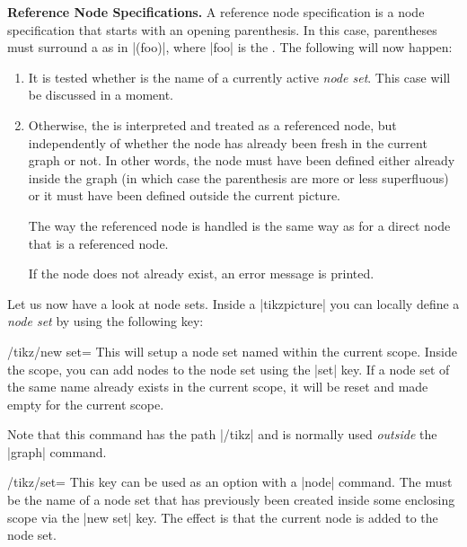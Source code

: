 \medskip
\textbf{Reference Node Specifications.} A reference node specification is a
node specification that starts with an opening parenthesis. In this case,
parentheses must surround a  as in |(foo)|, where |foo| is the
. The following will now happen:
%
\begin{enumerate}
    \item It is tested whether  is the name of a currently active
        \emph{node set}. This case will be discussed in a moment.
    \item Otherwise, the  is interpreted and treated as a referenced
        node, but independently of whether the node has already been fresh in
        the current graph or not. In other words, the node must have been
        defined either already inside the graph (in which case the parenthesis
        are more or less superfluous) or it must have been defined outside the
        current picture.

        The way the referenced node is handled is the same way as for a direct
        node that is a referenced node.

        If the node does not already exist, an error message is printed.
\end{enumerate}

Let us now have a look at node sets. Inside a |{tikzpicture}| you can locally
define a \emph{node set} by using the following key:
%
\begin{key}{/tikz/new set=}
    This will setup a node set named  within the current scope.
    Inside the scope, you can add nodes to the node set using the |set| key. If
    a node set of the same name already exists in the current scope, it will be
    reset and made empty for the current scope.

    Note that this command has the path |/tikz| and is normally used
    \emph{outside} the |graph| command.
\end{key}
%
\begin{key}{/tikz/set=}
    This key can be used as an option with a |node| command. The  must be the name of a node set that has previously been created
    inside some enclosing scope via the |new set| key. The effect is that the
    current node is added to the node set.
\end{key}

